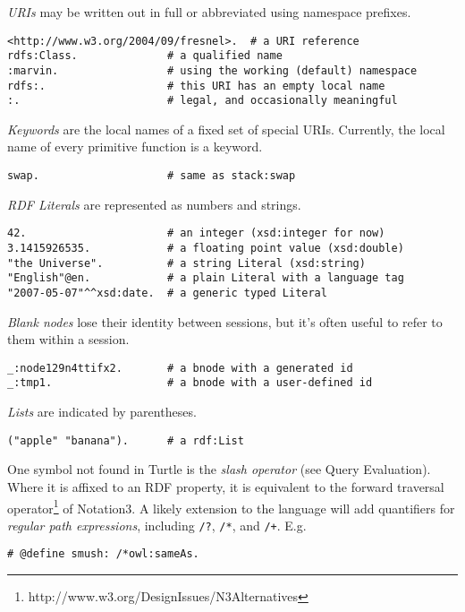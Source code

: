 \documentclass[runningheads]{llncs}
\begin{document}
\textit{URIs} may be written out in full or abbreviated using namespace prefixes.
\begin{verbatim}
<http://www.w3.org/2004/09/fresnel>.  # a URI reference
rdfs:Class.              # a qualified name
:marvin.                 # using the working (default) namespace
rdfs:.                   # this URI has an empty local name
:.                       # legal, and occasionally meaningful
\end{verbatim}

\textit{Keywords} are the local names of a fixed set of special URIs.  Currently, the local name of every primitive function is a keyword.
\begin{verbatim}
swap.                    # same as stack:swap
\end{verbatim}

\textit{RDF Literals} are represented as numbers and strings.
\begin{verbatim}
42.                      # an integer (xsd:integer for now)
3.1415926535.            # a floating point value (xsd:double)
"the Universe".          # a string Literal (xsd:string)
"English"@en.            # a plain Literal with a language tag
"2007-05-07"^^xsd:date.  # a generic typed Literal
\end{verbatim}

\textit{Blank nodes} lose their identity between sessions, but it's often useful to refer to them within a session.
\begin{verbatim}
_:node129n4ttifx2.       # a bnode with a generated id
_:tmp1.                  # a bnode with a user-defined id
\end{verbatim}

\textit{Lists} are indicated by parentheses.
\begin{verbatim}
("apple" "banana").      # a rdf:List
\end{verbatim}

One symbol not found in Turtle is the \textit{slash operator} (see Query Evaluation).  Where it is affixed to an RDF property, it is equivalent to the forward traversal operator\footnote{http://www.w3.org/DesignIssues/N3Alternatives} of Notation3.  A likely extension to the language will add quantifiers for \textit{regular path expressions}, including \texttt{/?}, \texttt{/*}, and \texttt{/+}.  E.g.
\begin{verbatim}
# @define smush: /*owl:sameAs.
\end{verbatim}
\end{document}
